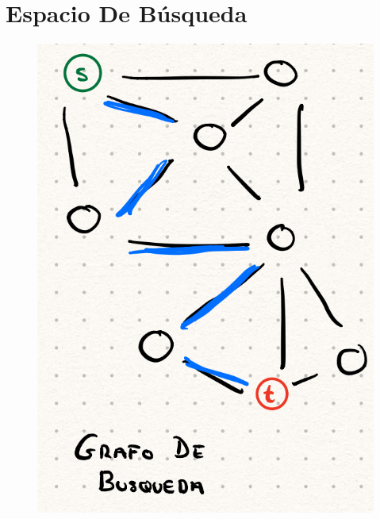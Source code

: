 \documentclass[12pt, twoside, openright]{report} %
\begin{document}
\section{Espacio De Búsqueda}
\begin{figure}[H]
	{\includegraphics[scale=.25]{Untitled 44.png}}
\end{figure}
\end{document}
